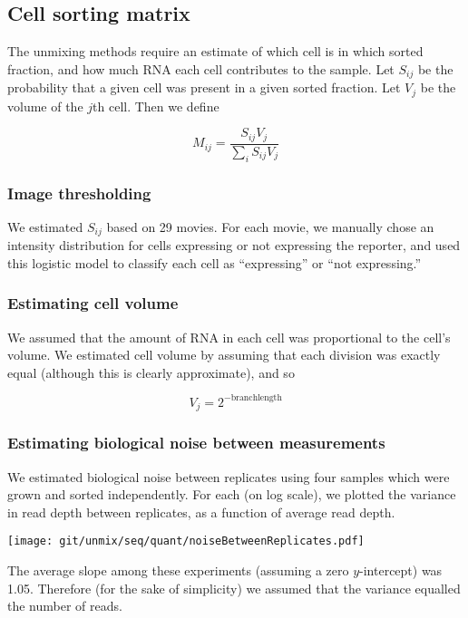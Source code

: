 \documentclass{article}
\begin{document}
\subsection*{Cell sorting matrix}

The unmixing methods require an estimate of which cell is in which sorted fraction,
and how much RNA each cell contributes to the sample. Let $S_{ij}$ be
the probability that a given cell was present in a given sorted fraction. Let $V_j$
be the volume of the $j$th cell. Then we define

\[
M_{ij} = \frac{S_{ij} V_j}{ \sum\limits_{i}^{} S_{ij} V_j }
\]


\subsubsection*{Image thresholding}

We estimated $S_{ij}$ based on 29 movies.
For each movie, we manually chose an intensity distribution for cells expressing
or not expressing the reporter, and 
used this logistic model to classify each cell as ``expressing'' or ``not expressing.''

\subsubsection*{Estimating cell volume}

We assumed that the amount of RNA in each cell was proportional to the cell's volume.
We estimated cell volume by assuming that each division was exactly equal (although
this is clearly approximate), and so

\[
V_j = 2^{-\mathrm{branchlength}}
\]

\subsubsection*{Estimating biological noise between measurements}

We estimated biological noise between replicates using four samples which were
grown and sorted independently. For each (on log scale), we plotted the variance
in read depth between replicates, as a function of average read depth.

\texttt{[image: git/unmix/seq/quant/noiseBetweenReplicates.pdf]}

The average slope among these experiments (assuming a zero $y$-intercept) was 1.05.
Therefore (for the sake of simplicity)
we assumed that the variance equalled the number of reads.
\end{document}
